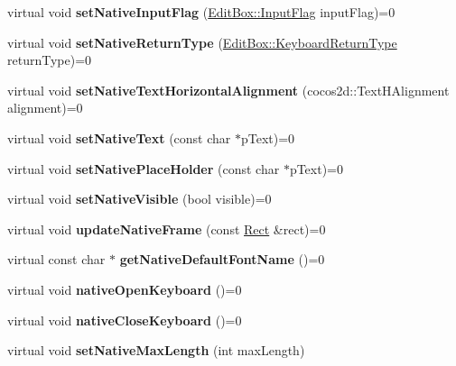 \begin{DoxyCompactItemize}
\item 
\mbox{\label{classui_1_1EditBoxImplCommon_ad802d49a85c44e5898330a729374a6cb}} 
virtual void {\bfseries set\+Native\+Input\+Flag} (\hyperlink{classui_1_1EditBox_af02f13ee9fba51d59bb3111e200848c8}{Edit\+Box\+::\+Input\+Flag} input\+Flag)=0
\item 
\mbox{\label{classui_1_1EditBoxImplCommon_a0ca8ae6b061946c5c024ff217418d874}} 
virtual void {\bfseries set\+Native\+Return\+Type} (\hyperlink{classui_1_1EditBox_a1e1285b6f742975b26bdeb8108ca6e51}{Edit\+Box\+::\+Keyboard\+Return\+Type} return\+Type)=0
\item 
\mbox{\label{classui_1_1EditBoxImplCommon_afc40bc41d726bcc3453b7c0c6c0efea7}} 
virtual void {\bfseries set\+Native\+Text\+Horizontal\+Alignment} (cocos2d\+::\+Text\+H\+Alignment alignment)=0
\item 
\mbox{\label{classui_1_1EditBoxImplCommon_aece93799db4e0f57ea841ed450a6580f}} 
virtual void {\bfseries set\+Native\+Text} (const char $\ast$p\+Text)=0
\item 
\mbox{\label{classui_1_1EditBoxImplCommon_ac17ce9bfb2ed55f5411afb5683a6cc92}} 
virtual void {\bfseries set\+Native\+Place\+Holder} (const char $\ast$p\+Text)=0
\item 
\mbox{\label{classui_1_1EditBoxImplCommon_afe447cbc3919f371c4d2931a92948b5a}} 
virtual void {\bfseries set\+Native\+Visible} (bool visible)=0
\item 
\mbox{\label{classui_1_1EditBoxImplCommon_aa156a0229508b57a75539d1a64882c37}} 
virtual void {\bfseries update\+Native\+Frame} (const \hyperlink{classRect}{Rect} \&rect)=0
\item 
\mbox{\label{classui_1_1EditBoxImplCommon_a424aa227e4462d4abf19ea73efc55a71}} 
virtual const char $\ast$ {\bfseries get\+Native\+Default\+Font\+Name} ()=0
\item 
\mbox{\label{classui_1_1EditBoxImplCommon_a26c5b695b9b0e41b125acf96cb45aaef}} 
virtual void {\bfseries native\+Open\+Keyboard} ()=0
\item 
\mbox{\label{classui_1_1EditBoxImplCommon_a21d3c53e5332196a161093f5202c1e77}} 
virtual void {\bfseries native\+Close\+Keyboard} ()=0
\item 
\mbox{\label{classui_1_1EditBoxImplCommon_a2e529a5473972dad1c40441f989ad7fe}} 
virtual void {\bfseries set\+Native\+Max\+Length} (int max\+Length)
\end{DoxyCompactItemize}
